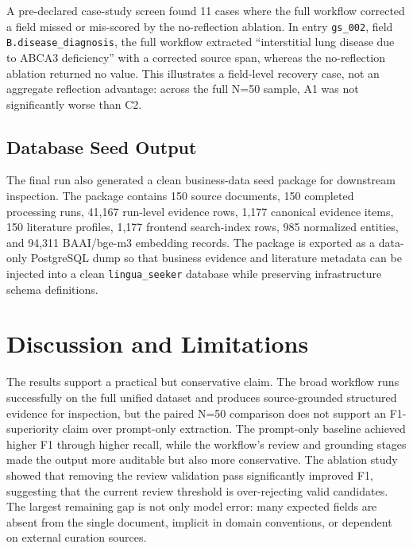 \documentclass[conference]{IEEEtran}
\newcommand{\bmode}{broad}
\begin{document}
A pre-declared case-study screen found 11 cases where the full workflow corrected a field missed or mis-scored by the no-reflection ablation. In entry \texttt{gs\_002}, field \texttt{B.disease\_diagnosis}, the full workflow extracted ``interstitial lung disease due to ABCA3 deficiency'' with a corrected source span, whereas the no-reflection ablation returned no value. This illustrates a field-level recovery case, not an aggregate reflection advantage: across the full N=50 sample, A1 was not significantly worse than C2.

\subsection{Database Seed Output}
The final run also generated a clean business-data seed package for downstream inspection. The package contains 150 source documents, 150 completed processing runs, 41,167 run-level evidence rows, 1,177 canonical evidence items, 150 literature profiles, 1,177 frontend search-index rows, 985 normalized entities, and 94,311 BAAI/bge-m3 embedding records. The package is exported as a data-only PostgreSQL dump so that business evidence and literature metadata can be injected into a clean \texttt{lingua\_seeker} database while preserving infrastructure schema definitions.


\section{Discussion and Limitations}
The results support a practical but conservative claim. The \bmode{} workflow runs successfully on the full unified dataset and produces source-grounded structured evidence for inspection, but the paired N=50 comparison does not support an F1-superiority claim over prompt-only extraction. The prompt-only baseline achieved higher F1 through higher recall, while the workflow's review and grounding stages made the output more auditable but also more conservative. The ablation study showed that removing the review validation pass significantly improved F1, suggesting that the current review threshold is over-rejecting valid candidates. The largest remaining gap is not only model error: many expected fields are absent from the single document, implicit in domain conventions, or dependent on external curation sources.
\end{document}
